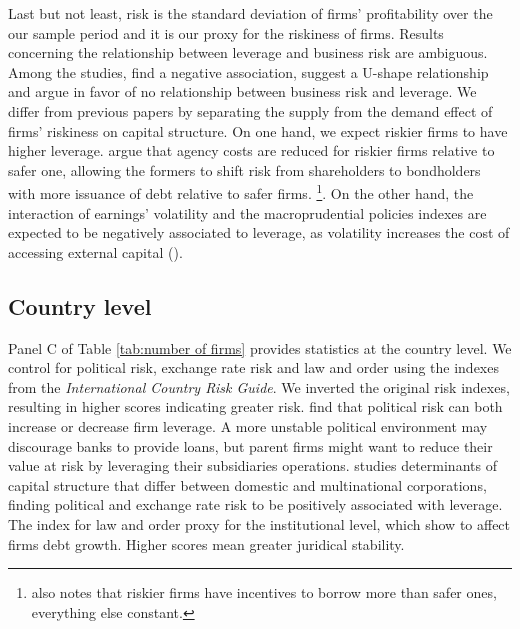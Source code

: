 \documentclass[12pt]{article}
\begin{document}
	Last but not least, risk is the standard deviation of firms' profitability over the our sample period and it is our proxy for the riskiness of firms. Results concerning the relationship between leverage and business risk are ambiguous. Among the studies, \cite*{bradley1984existence} find a negative association, \cite*{kale1991effect} suggest a U-shape relationship and \cite{titman1988determinants} argue in favor of no relationship between business risk and leverage. We differ from previous papers by separating the supply from the demand effect of firms' riskiness on capital structure. On one hand, we expect riskier firms to have higher leverage. \cite*{bennett1993determinants} argue that agency costs are reduced for riskier firms relative to safer one, allowing the formers to shift risk from shareholders to bondholders with more issuance of debt relative to safer firms. \footnote{\cite{myers1977determinants} also notes that riskier firms have incentives to borrow more than safer ones, everything else constant.}. On the other hand, the interaction of earnings' volatility and the macroprudential policies indexes are expected to be negatively associated to leverage, as volatility increases the cost of accessing external capital (\cite{minton1999impact}).
	   
		\begin{small}
		{
			
		}
	\end{small}

	\subsection{Country level} \label{subsec:country}
	Panel C of Table \ref{tab:number of firms} provides statistics at the country level. We control for political risk, exchange rate risk and law and order using the indexes from the \textit{International Country Risk Guide}. We inverted the original risk indexes, resulting in higher scores indicating greater risk. \cite*{kesternich2010afraid} find that political risk can both increase or decrease firm leverage. A more unstable political environment may discourage banks to provide loans, but parent firms might want to reduce their value at risk by leveraging their subsidiaries operations. \cite*{burgman1996empirical} studies determinants of capital structure that differ between domestic and multinational corporations, finding political and exchange rate risk to be positively associated with leverage. The index for law and order proxy for the institutional level, which \cite*{demirgucc1998law} show to affect firms debt growth. Higher scores mean greater juridical stability.
	
\end{document}
